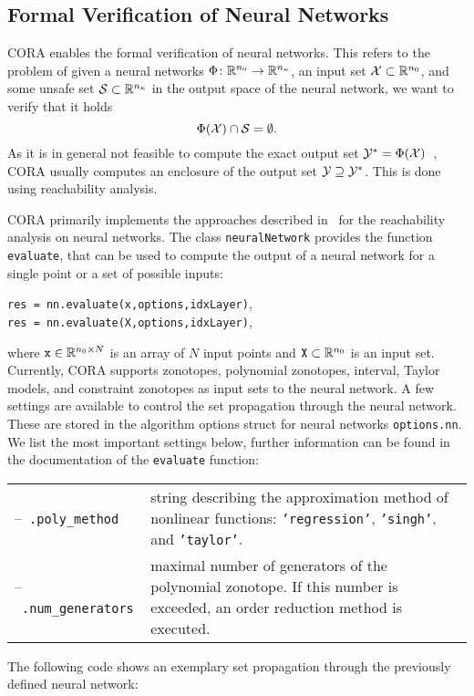 \subsection{Formal Verification of Neural Networks}
\label{sec:neuralNetworkVerification}

CORA enables the formal verification of neural networks.
This refers to the problem of given a neural networks $\Phi\colon\mathbb{R}^{n_0}\to\mathbb{R}^{n_{\kappa}}$,
an input set $\mathcal{X}\subset\mathbb{R}^{n_0}$,
and some unsafe set $\mathcal{S}\subset\mathbb{R}^{n_{\kappa}}$ in the output space of the neural network,
we want to verify that it holds
\begin{equation}
    \Phi(\mathcal{X}) \cap \mathcal{S} = \emptyset.
\end{equation}
As it is in general not feasible to compute the exact output set $\mathcal{Y}^*=\Phi(\mathcal{X})$~\cite{Katz2017},
CORA usually computes an enclosure of the output set $\mathcal{Y}\supseteq\mathcal{Y}^*$.
This is done using reachability analysis.

CORA primarily implements the approaches described in~\cite{Kochdumper2023b,ladner2023a} for the reachability analysis on neural networks.
The class \texttt{neuralNetwork} provides the function \texttt{evaluate}, that can be used to compute the output of a neural network for a single point or a set of possible inputs:
\begin{center}
    \texttt{res = nn.evaluate(x,options,idxLayer)}, \\
    \texttt{res = nn.evaluate(X,options,idxLayer)},
\end{center}
where $\texttt{x}\in\mathbb{R}^{n_0\times N}$ is an array of $N$ input points and $\texttt{X}\subset\mathbb{R}^{n_0}$ is an input set.
Currently, CORA supports zonotopes, polynomial zonotopes, interval, Taylor models, and constraint zonotopes as input sets to the neural network.
A few settings are available to control the set propagation through the neural network.
These are stored in the algorithm options struct for neural networks \texttt{options.nn}.
We list the most important settings below, further information can be found in the documentation of the \texttt{evaluate} function:

\begin{center}
    \renewcommand{\arraystretch}{1.3}
    \begin{longtable}[t]{l p{11cm}}
        --~\texttt{.poly\_method} & string describing the approximation method of nonlinear functions: \texttt{'regression'}, \texttt{'singh'}, and \texttt{'taylor'}. \\
        --~\texttt{.num\_generators} & maximal number of generators of the polynomial zonotope. If this number is exceeded, an order reduction method is executed.
    \end{longtable}
\end{center}
The following code shows an exemplary set propagation through the previously defined neural network:

